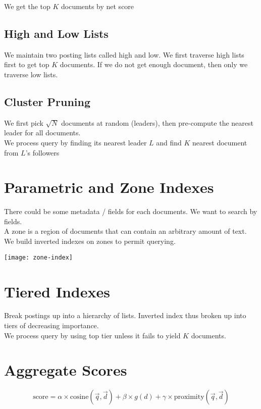 \begin{multicols*}{2}
\noindent We get the top $K$ documents by net score

\subsection{High and Low Lists}
\noindent We maintain two posting lists called high and low. We first traverse high lists first to get top $K$ documents. If we do not get enough document, then only we traverse low lists. 

\subsection{Cluster Pruning}
\noindent We first pick $\sqrt{N}$ documents at random (leaders), then pre-compute the nearest leader for all documents. \\
\noindent We process query by finding its nearest leader $L$ and find $K$ nearest document from $L$’s followers

\section{Parametric and Zone Indexes}
\noindent There could be some metadata / fields for each documents. We want to search by fields. \\

\noindent A zone is a region of documents that can contain an arbitrary amount of text. We build inverted indexes on zones to permit querying.

\begin{center}
\texttt{[image: zone-index]}
\end{center}

\section{Tiered Indexes}
\noindent Break postings up into a hierarchy of lists. Inverted index thus broken up into tiers of decreasing importance.\\

\noindent We process query by using top tier unless it fails to yield $K$ documents. 

\section{Aggregate Scores}

$$\text{score} = \alpha \times \text{cosine}(\vec{q},\vec{d}) + \beta \times g(d) + \gamma \times \text{proximity}(\vec{q},\vec{d})$$

\end{multicols*}
